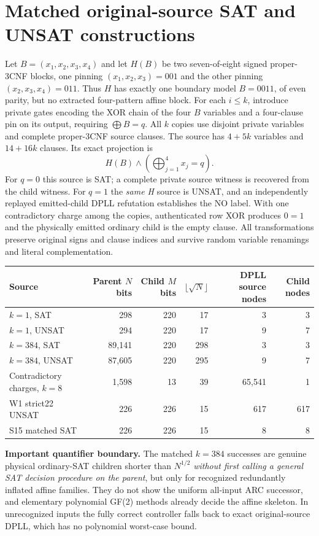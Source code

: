 \documentclass[11pt]{article}
\begin{document}
\section{Matched original-source SAT and UNSAT constructions}
Let $B=(x_1,x_2,x_3,x_4)$ and let $H(B)$ be two seven-of-eight signed proper-3CNF blocks, one pinning $(x_1,x_2,x_3)=001$ and the other pinning $(x_2,x_3,x_4)=011$. Thus $H$ has exactly one boundary model $B=0011$, of even parity, but no extracted four-pattern affine block. For each $i\le k$, introduce private gates encoding the XOR chain of the four $B$ variables and a four-clause pin on its output, requiring $\bigoplus B=q$. All $k$ copies use disjoint private variables and complete proper-3CNF source clauses. The source has $4+5k$ variables and $14+16k$ clauses. Its exact projection is
\[
  H(B)\land(\textstyle\bigoplus_{j=1}^4 x_j=q).
\]
For $q=0$ this source is SAT; a complete private source witness is recovered from the child witness. For $q=1$ the \emph{same H} source is UNSAT, and an independently replayed emitted-child DPLL refutation establishes the NO label. With one contradictory charge among the copies, authenticated row XOR produces $0=1$ and the physically emitted ordinary child is the empty clause. All transformations preserve original signs and clause indices and survive random variable renamings and literal complementation.

\begin{center}\begin{tabular}{lrrrrr}\toprule
Source & Parent $N$ bits & Child $M$ bits & $\lfloor\sqrt N\rfloor$ & DPLL source nodes & Child nodes \\\midrule
$k=1$, SAT & 298 & 220 & 17 & 3 & 3 \\
$k=1$, UNSAT & 294 & 220 & 17 & 9 & 7 \\
$k=384$, SAT & 89,141 & 220 & 298 & 3 & 3 \\
$k=384$, UNSAT & 87,605 & 220 & 295 & 9 & 7 \\
Contradictory charges, $k=8$ & 1,598 & 13 & 39 & 65,541 & 1 \\
W1 strict22 UNSAT & 226 & 226 & 15 & 617 & 617 \\
S15 matched SAT & 226 & 226 & 15 & 8 & 8 \\\bottomrule\end{tabular}\end{center}
\noindent\textbf{Important quantifier boundary.} The matched $k=384$ successes are genuine physical ordinary-SAT children shorter than $N^{1/2}$ \emph{without first calling a general SAT decision procedure on the parent}, but only for recognized redundantly inflated affine families. They do not show the uniform all-input ARC successor, and elementary polynomial GF(2) methods already decide the affine skeleton. In unrecognized inputs the fully correct controller falls back to exact original-source DPLL, which has no polynomial worst-case bound.
\end{document}
